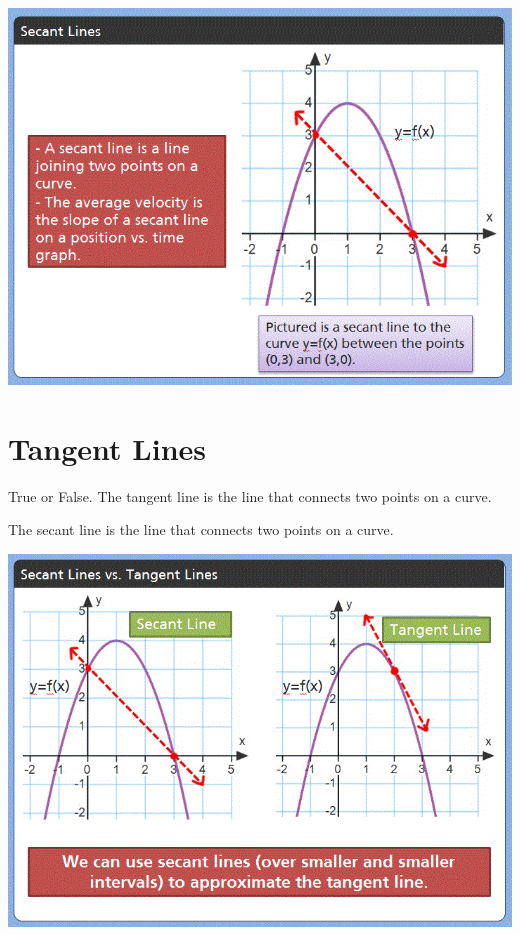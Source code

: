 \documentclass{ximera}
\begin{document}

\begin{image}
\includegraphics{picture5.gif}
\end{image}

\section{Tangent Lines}


\begin{question}
  True or False. The tangent line is the line that connects two points on a curve. 
  \begin{multipleChoice}
  \end{multipleChoice}
  \begin{feedback}
  The secant line is the line that connects two points on a curve.
  \end{feedback}
\end{question}

\begin{image}
\includegraphics{picture6.gif}
\end{image}
\end{document}
